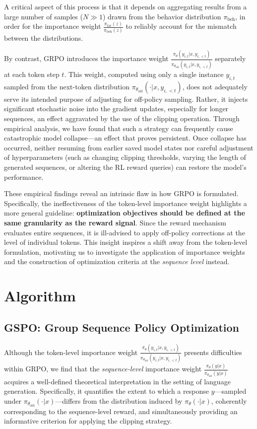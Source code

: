 A critical aspect of this process is that it depends on aggregating results from a large number of samples ($N \gg 1$) drawn from the behavior distribution $\pi_\text{beh}$, in order for the importance weight $\frac{ \pi_\text{tar} (z) }{ \pi_\text{beh} (z)}$ to reliably account for the mismatch between the distributions.

By contrast, GRPO introduces the importance weight $\frac{ \pi_{\theta} (y_{i,t} | x, y_{i,<t}) }{ \pi_{\theta_\text{old}} (y_{i,t} | x,y_{i,<t})}$ separately at each token step $t$. This weight, computed using only a single instance $y_{i,t}$ sampled from the next-token distribution $\pi_{\theta_\text{old}}( \cdot | x, y_{i, <t})$, does not adequately serve its intended purpose of adjusting for off-policy sampling. Rather, it injects significant stochastic noise into the gradient updates, especially for longer sequences, an effect aggravated by the use of the clipping operation. Through empirical analysis, we have found that such a strategy can frequently cause catastrophic model collapse—an effect that proves persistent. Once collapse has occurred, neither resuming from earlier saved model states nor careful adjustment of hyperparameters (such as changing clipping thresholds, varying the length of generated sequences, or altering the RL reward queries) can restore the model’s performance.

These empirical findings reveal an intrinsic flaw in how GRPO is formulated. Specifically, the ineffectiveness of the token-level importance weight highlights a more general guideline: \textbf{optimization objectives should be defined at the same granularity as the reward signal}. Since the reward mechanism evaluates entire sequences, it is ill-advised to apply off-policy corrections at the level of individual tokens. This insight inspires a shift away from the token-level formulation, motivating us to investigate the application of importance weights and the construction of optimization criteria at the \textit{sequence level} instead.

\section{Algorithm}

\subsection{GSPO: Group Sequence Policy Optimization}

Although the token-level importance weight $\frac{ \pi_{\theta} (y_{i,t} | x, y_{i,<t}) }{ \pi_{\theta_\text{old}} (y_{i,t} | x,y_{i,<t})}$ presents difficulties within GRPO, we find that the \textit{sequence-level} importance weight $\frac{ \pi_{\theta} (y | x) }{ \pi_{\theta_\text{old}} (y | x)}$ acquires a well-defined theoretical interpretation in the setting of language generation. Specifically, it quantifies the extent to which a response $y$—sampled under $\pi_{\theta_\text{old}} (\cdot | x)$—differs from the distribution induced by $\pi_{\theta} (\cdot | x)$, coherently corresponding to the sequence-level reward, and simultaneously providing an informative criterion for applying the clipping strategy.

